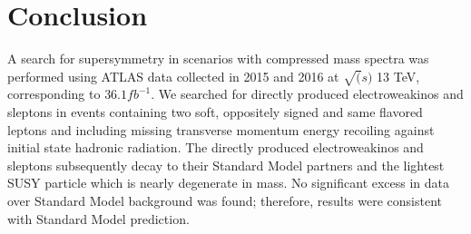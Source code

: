 \chapter{Conclusion}
A search for supersymmetry in scenarios with compressed mass spectra was performed using ATLAS data collected in 2015 and 2016 at $\sqrt(s)$ 13 TeV, corresponding to $36.1 fb^{-1}$.  We searched for directly produced electroweakinos and sleptons in events containing two soft, oppositely signed and same flavored leptons and including missing transverse momentum energy recoiling against initial state hadronic radiation.  The directly produced electroweakinos and sleptons subsequently decay to their Standard Model partners and the lightest SUSY particle which is nearly degenerate in mass.  No significant excess in data over Standard Model background was found; therefore, results were consistent with Standard Model prediction. 

